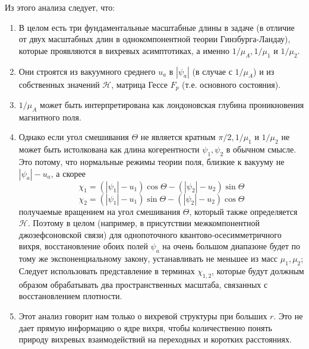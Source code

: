 Из этого анализа следует, что:
\begin{enumerate}
    \item В целом есть три фундаментальные масштабные длины в задаче (в 
        отличие от двух масштабных длин в однокомпонентной теории 
        Гинзбурга-Ландау), которые проявляются в вихревых асимптотиках, а 
        именно \( 1/\mu_A, 1/\mu_1 \) и \( 1/\mu_2 \).
    \item Они строятся из вакуумного среднего \( u_a \) в \( |\psi_a| \) 
        (в случае с \( 1/\mu_A \)) и из собственных значений 
        \( \mathcal{H} \), матрица Гессе \( F_p \) (т.е. основного состояния).
    \item \( 1/\mu_{A} \) может быть интерпретирована как лондоновская глубина 
        проникновения магнитного поля.
    \item Однако если угол смешивания \( \Theta \) не является кратным  
        \( \pi/2, 1/\mu_1 \) и \( 1/\mu_2 \) не может быть истолкована как 
        длина когерентности \( \psi_1, \psi_2 \) в обычном смысле. Это потому, 
        что нормальные режимы теории поля, близкие к вакууму не 
        \( |\psi_a| - u_a \), а скорее
        \[ 
            \chi_1 = (|\psi_1| - u_1)\cos\Theta - (|\psi_2| - u_2)\sin\Theta 
        \]
        \[ 
            \chi_2 = (|\psi_1| - u_1)\sin\Theta - (|\psi_2| - u_2)\cos\Theta 
        \]
        получаемые вращением на угол смешивания \( \Theta \), который также 
        определяется \( \mathcal{H} \). Поэтому в целом (например, в 
        присутствии межкомпонентной джозефсоновской связи) для однопоточного
        квантово-осесимметричного вихря, восстановление обоих полей
        \( \psi_a \) на очень большом диапазоне будет по тому же 
        экспоненциальному закону, устанавливать не меньшее из масс 
        \( \mu_1, \mu_2 \); Следует использовать представление в терминах 
        \( \chi_{1,2} \), которые будут должным образом обрабатывать два 
        пространственных масштаба, связанных с восстановлением плотности.
    \item Этот анализ говорит нам только о вихревой структуры при больших
        \( r \). Это не дает прямую информацию о ядре вихря, чтобы 
        количественно понять природу вихревых взаимодействий на переходных 
        и коротких расстояниях.
\end{enumerate}

